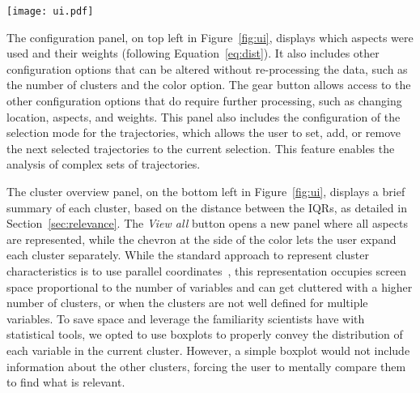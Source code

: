 \begin{figure*}
    \centering 
    \texttt{[image: ui.pdf]}
    \caption{Initial interface of our method showing the demographic evolution of Chicago. 
        \textbf{(a)}: Configuration panel with the current clustering parameters and controls.
        \textbf{(b)}: Cluster overview illustrating the most relevant aspect for each cluster. 
        \textbf{(c)}: Trajectories overview and the general evolution of the population, geographical information, and how it changed. 
        \textbf{(d)}: Details of the selected trajectories, including precise geographic locations, population numbers, and the composition of the aspects.\label{fig:ui}}
\end{figure*}


The configuration panel, on top left in Figure~\ref{fig:ui}, displays which
aspects were used and their weights (following Equation~\ref{eq:dist}). It also
includes other configuration options that can be altered without re-processing
the data, such as the number of clusters and the color option. The gear button
allows access to the other configuration options that do require further
processing, such as changing location, aspects, and weights. This panel also
includes the configuration of the selection mode for the trajectories, which
allows the user to set, add, or remove the next selected trajectories to the
current selection. This feature enables the analysis of complex sets of
trajectories.


The cluster overview panel, on the bottom left in Figure~\ref{fig:ui}, displays
a brief summary of each cluster, based on the distance between the IQRs, as
detailed in Section~\ref{sec:relevance}. The \emph{View all} button opens a new
panel where all aspects are represented, while the chevron at the side of the
color lets the user expand each cluster separately. While the standard approach
to represent cluster characteristics is to use parallel
coordinates~\cite{johansson2005revealing,guo2006visualization}, this
representation occupies screen space proportional to the number of variables and
can get cluttered with a higher number of clusters, or when the clusters are not
well defined for multiple variables. To save space and leverage the familiarity
scientists have with statistical tools, we opted to use boxplots to properly
convey the distribution of each variable in the current cluster. However, a
simple boxplot would not include information about the other clusters, forcing
the user to mentally compare them to find what is relevant. 

